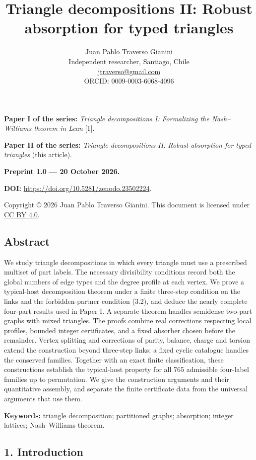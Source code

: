 \documentclass[english,11pt,a4paper]{article}
\title{Triangle decompositions II: Robust absorption for typed triangles}
\author{Juan Pablo Traverso Gianini\\
\small Independent researcher, Santiago, Chile\\
\small \href{mailto:jtraverso@gmail.com}{jtraverso@gmail.com}\\
\small ORCID: 0009-0003-6068-4096}
\date{}
\begin{document}
\raggedbottom
\maketitle
\textbf{Paper I of the series:} \emph{Triangle decompositions I: Formalizing the Nash--Williams theorem in Lean} {[}1{]}.

\textbf{Paper II of the series:} \emph{Triangle decompositions II: Robust absorption for typed triangles} (this article).

\textbf{Preprint 1.0 --- 20 October 2026.}

\textbf{DOI:} \url{https://doi.org/10.5281/zenodo.23502224}.

Copyright © 2026 Juan Pablo Traverso Gianini. This document is licensed under \href{https://creativecommons.org/licenses/by/4.0/}{CC BY 4.0}.

\subsection{Abstract}\label{abstract}

We study triangle decompositions in which every triangle must use a prescribed multiset of part labels. The necessary divisibility conditions record both the global numbers of edge types and the degree profile at each vertex. We prove a typical-host decomposition theorem under a finite three-step condition on the links and the forbidden-partner condition (3.2), and deduce the nearly complete four-part results used in Paper I. A separate theorem handles semidense two-part graphs with mixed triangles. The proofs combine real corrections respecting local profiles, bounded integer certificates, and a fixed absorber chosen before the remainder. Vertex splitting and corrections of parity, balance, charge and torsion extend the construction beyond three-step links; a fixed cyclic catalogue handles the conserved families. Together with an exact finite classification, these constructions establish the typical-host property for all 765 admissible four-label families up to permutation. We give the construction arguments and their quantitative assembly, and separate the finite certificate data from the universal arguments that use them.

\textbf{Keywords:} triangle decomposition; partitioned graphs; absorption; integer lattices; Nash--Williams theorem.

\subsection{1. Introduction}\label{introduction}
\end{document}
